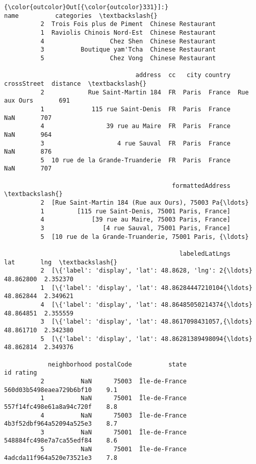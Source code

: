 \documentclass[11pt]{article}
\begin{document}
\begin{Verbatim}[commandchars=\\\{\}]
{\color{outcolor}Out[{\color{outcolor}331}]:}                         name          categories  \textbackslash{}
          2  Trois Fois plus de Piment  Chinese Restaurant   
          1  Raviolis Chinois Nord-Est  Chinese Restaurant   
          4                  Chez Shen  Chinese Restaurant   
          3          Boutique yam'Tcha  Chinese Restaurant   
          5                  Chez Vong  Chinese Restaurant   
          
                                    address  cc   city country   crossStreet  distance  \textbackslash{}
          2            Rue Saint-Martin 184  FR  Paris  France  Rue aux Ours       691   
          1             115 rue Saint-Denis  FR  Paris  France           NaN       707   
          4                 39 rue au Maire  FR  Paris  France           NaN       964   
          3                    4 rue Sauval  FR  Paris  France           NaN       876   
          5  10 rue de la Grande-Truanderie  FR  Paris  France           NaN       707   
          
                                              formattedAddress  \textbackslash{}
          2  [Rue Saint-Martin 184 (Rue aux Ours), 75003 Pa{\ldots}   
          1         [115 rue Saint-Denis, 75001 Paris, France]   
          4             [39 rue au Maire, 75003 Paris, France]   
          3                [4 rue Sauval, 75001 Paris, France]   
          5  [10 rue de la Grande-Truanderie, 75001 Paris, {\ldots}   
          
                                                labeledLatLngs        lat       lng  \textbackslash{}
          2  [\{'label': 'display', 'lat': 48.8628, 'lng': 2{\ldots}  48.862800  2.352370   
          1  [\{'label': 'display', 'lat': 48.86284447210104{\ldots}  48.862844  2.349621   
          4  [\{'label': 'display', 'lat': 48.86485050214374{\ldots}  48.864851  2.355559   
          3  [\{'label': 'display', 'lat': 48.8617098431057,{\ldots}  48.861710  2.342380   
          5  [\{'label': 'display', 'lat': 48.86281389498094{\ldots}  48.862814  2.349376   
          
            neighborhood postalCode          state                        id rating  
          2          NaN      75003  Île-de-France  560d03b5498eaea729b6bf10    9.1  
          1          NaN      75001  Île-de-France  557f14fc498e61a8a94c720f    8.8  
          4          NaN      75003  Île-de-France  4b3f52dbf964a52094a525e3    8.7  
          3          NaN      75001  Île-de-France  548884fc498e7a7ca55edf84    8.6  
          5          NaN      75001  Île-de-France  4adcda11f964a520e73521e3    7.8  
\end{Verbatim}
            
\end{document}
